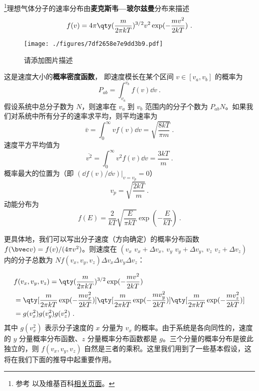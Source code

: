 \footnote{参考 \cite{新热} 以及维基百科\href{https://en.wikipedia.org/wiki/Maxwell-Boltzmann_distribution}{相关页面}。}理想气体分子的速率分布由\textbf{麦克斯韦—玻尔兹曼}分布来描述
\begin{equation}
f(v) = 4\pi \qty(\frac{m}{2\pi kT})^{3/2} v^2 \exp(-\frac{mv^2}{2kT})~.
\end{equation}

\begin{figure}[ht]
\centering
\texttt{[image: ./figures/7df2658e7e9dd3b9.pdf]}
\caption{请添加图片描述} \label{fig_MxwBzm_2}
\end{figure}

这是速度大小的\textbf{概率密度函数}， 即速度模长在某个区间 $v \in [v_a, v_b]$ 的概率为
\begin{equation}
P_{ab} = \int_{v_a}^{v_b} f(v) \dd{v}~.
\end{equation}
假设系统中总分子数为 $N$，则速率在 $v_a$ 到 $v_b$ 范围内的分子个数为 $P_{ab}N$。如果我们对系统中所有分子的速率求平均，则平均速率为
\begin{equation}
\bar v = \int_{0}^\infty v f(v)\dd v= \sqrt{\frac{8kT}{\pi m}}~.
\end{equation}
速度平方平均值为
\begin{equation}\label{eq_MxwBzm_1}
\overline {v^2} = \int_{0}^\infty v^2 f(v)\dd v = \frac{3kT}{m}~.
\end{equation}
概率最大的位置为（即 $(\dd f(v)/\dd v)|_{v=v_p}=0$）
\begin{equation}
v_p =\sqrt{\frac{2kT}{m}}~.
\end{equation}
动能分布为
\begin{equation}
f(E) = \frac{2}{kT}\sqrt{\frac{E}{\pi kT}} \exp(-\frac{E}{kT})~.
\end{equation}

更具体地，我们可以写出分子速度（方向确定）的概率分布函数 $f(\bvec v)=f(v)/(4\pi v^2)$。则速度在 $(v_x\text{~}v_x+\Delta v_x,\ v_y\text{~}v_y+\Delta v_y,\ v_z\text{~}v_z+\Delta v_z)$ 内的分子总数为 $N f(v_x,v_y,v_z)\Delta v_x\Delta v_y\Delta v_z$：

\begin{equation}
\begin{aligned}
&f(v_x,v_y,v_z)=\qty(\frac{m}{2\pi k T})^{3/2}\exp(-\frac{mv^2}{2kT})\\
&=\qty[\frac{m}{2\pi kT}\exp(-\frac{mv_x^2}{2kT})]\qty[\frac{m}{2\pi kT}\exp(-\frac{mv_y^2}{2kT})]\qty[\frac{m}{2\pi kT}\exp(-\frac{mv_z^2}{2kT})]\\
&=g(v_x^2)g(v_y^2)g(v_z^2)~.
\end{aligned}
\end{equation}
其中 $g(v_x^2)$ 表示分子速度的 $x$ 分量为 $v_x$ 的概率。由于系统是各向同性的，速度的 $y$ 分量概率分布函数、$z$ 分量概率分布函数都是 $g$。三个分量的概率分布是彼此独立的，则 $f(v_x,v_y,v_z)$ 自然是三者的乘积。这里我们用到了一些基本假设，这将在我们下面的推导中起重要作用。


